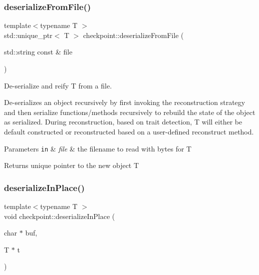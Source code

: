 \mbox{\label{namespacecheckpoint_ad71bcfe197379c59aa16f737b7e2cf3e}} 
\subsubsection{\texorpdfstring{deserialize\+From\+File()}{deserializeFromFile()}}
{\footnotesize\ttfamily template$<$typename T $>$ \\
std\+::unique\+\_\+ptr$<$ T $>$ checkpoint\+::deserialize\+From\+File (\begin{DoxyParamCaption}\item[{std\+::string const \&}]{file }\end{DoxyParamCaption})}



De-\/serialize and reify {\ttfamily T} from a file. 

De-\/serializes an object recursively by first invoking the reconstruction strategy and then {\ttfamily serialize} functions/methods recursively to rebuild the state of the object as serialized. During reconstruction, based on trait detection, {\ttfamily T} will either be default constructed or reconstructed based on a user-\/defined reconstruct method.


\begin{DoxyParams}[1]{Parameters}
\mbox{\tt in}  & {\em file} & the filename to read with bytes for {\ttfamily T} \\
\hline
\end{DoxyParams}
\begin{DoxyReturn}{Returns}
unique pointer to the new object {\ttfamily T} 
\end{DoxyReturn}
\mbox{\label{namespacecheckpoint_af605968a3b8731448c68e5c9fff917ee}} 
\subsubsection{\texorpdfstring{deserialize\+In\+Place()}{deserializeInPlace()}}
{\footnotesize\ttfamily template$<$typename T $>$ \\
void checkpoint\+::deserialize\+In\+Place (\begin{DoxyParamCaption}\item[{char $\ast$}]{buf,  }\item[{T $\ast$}]{t }\end{DoxyParamCaption})}



